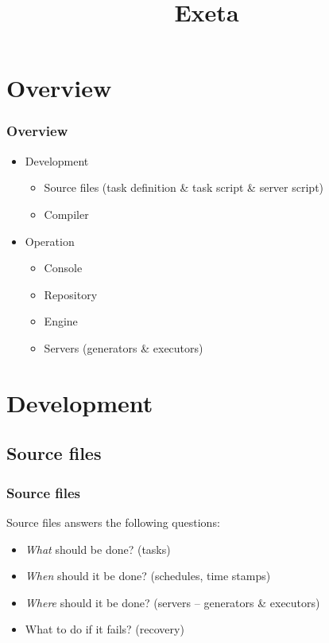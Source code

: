 \documentclass[english,xcolor={dvipsnames}]{beamer}
\title{Exeta}
\begin{document}
\frame{%
\titlepage
}


\section{Overview}

\begin{frame}
\frametitle{Overview}
\begin{itemize}
    \item Development
    \begin{itemize}
        \item Source files (task definition \& task script \& server script)
        \item Compiler
    \end{itemize}
    \item Operation
    \begin{itemize}
        \item Console %
        \item Repository
        \item Engine
        \item Servers (generators \& executors) %
    \end{itemize}
\end{itemize}
\end{frame}

\section{Development}

\subsection{Source files}

\begin{frame}
\frametitle{Source files}
Source files answers the following questions:
\begin{itemize}
    \item \emph{What} should be done? (tasks)
    \item \emph{When} should it be done? (schedules, time stamps)
    \item \emph{Where} should it be done? (servers -- generators \& executors)
    \item What to do if it fails? (recovery)
\end{itemize}
\end{frame}
\end{document}
